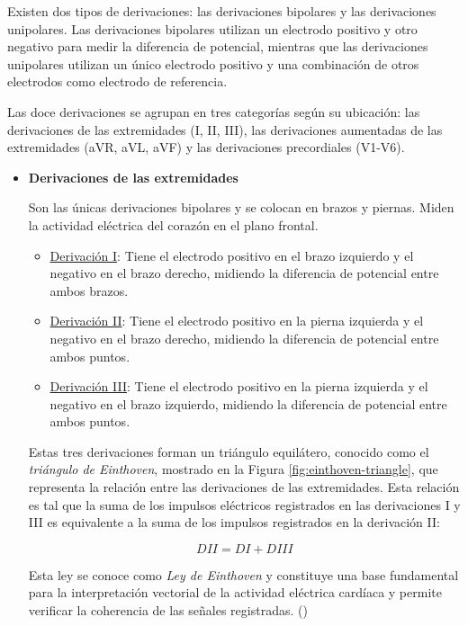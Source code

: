 \documentclass[12pt,a4paper,twoside]{book}
\begin{document}
Existen dos tipos de derivaciones: las derivaciones bipolares y las derivaciones unipolares. 
Las derivaciones bipolares utilizan un electrodo positivo y otro negativo para medir la diferencia de potencial, mientras que las derivaciones unipolares utilizan un único electrodo positivo y una combinación de otros electrodos como electrodo de referencia.

Las doce derivaciones se agrupan en tres categorías según su ubicación: las derivaciones de las extremidades (I, II, III), las derivaciones aumentadas de las extremidades (aVR, aVL, aVF) y las derivaciones precordiales (V1-V6).

\begin{itemize}
	\item \textbf{Derivaciones de las extremidades}
	
	Son las únicas derivaciones bipolares y se colocan en brazos y piernas. Miden la actividad eléctrica del corazón en el plano frontal. 
	
	\begin{itemize}
		\item \underline{Derivación I}: Tiene el electrodo positivo en el brazo izquierdo y el negativo en el brazo derecho, midiendo la diferencia de potencial entre ambos brazos.
		\item \underline{Derivación II}: Tiene el electrodo positivo en la pierna izquierda y el negativo en el brazo derecho, midiendo la diferencia de potencial entre ambos puntos.
		\item \underline{Derivación III}: Tiene el electrodo positivo en la pierna izquierda y el negativo en el brazo izquierdo, midiendo la diferencia de potencial entre ambos puntos.
	\end{itemize}
	Estas tres derivaciones forman un triángulo equilátero, conocido como el \textit{triángulo de Einthoven}, mostrado en la Figura \ref{fig:einthoven-triangle}, que representa la relación entre las derivaciones de las extremidades. Esta relación es tal que la suma de los impulsos eléctricos registrados en las derivaciones I y III es equivalente a la suma de los impulsos registrados en la derivación II:
	
	\begin{equation*}
		DII = DI + DIII
	\end{equation*}

	
	
	Esta ley se conoce como \textit{Ley de Einthoven} y constituye una base fundamental para la interpretación vectorial de la actividad eléctrica cardíaca y permite verificar la coherencia de las señales registradas. (\cite{myekg_derivaciones_cardiacas})


\end{itemize}
\end{document}
